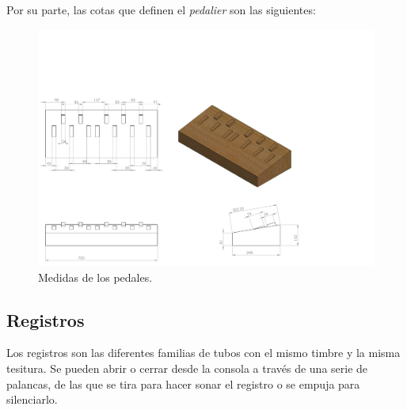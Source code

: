 \smallskip

Por su parte, las cotas que definen el \textit{pedalier} son las siguientes:

\smallskip

\begin{figure}[H]
	\noindent \begin{centering}
		\includegraphics[clip=true,trim=0 0 260 250, width=\linewidth*3/4]{capitulo3/pedalier_modelo}
		\par\end{centering}
	\smallskip
	\caption{\label{fig:pedalier_modelo} Medidas de los pedales.}
\end{figure} 

\smallskip

\subsection{Registros}

Los registros son las diferentes familias de tubos con el mismo timbre y la misma tesitura. Se pueden abrir o cerrar desde la consola a través de una serie de palancas, de las que se tira para hacer sonar el registro o se empuja para silenciarlo.

\smallskip

